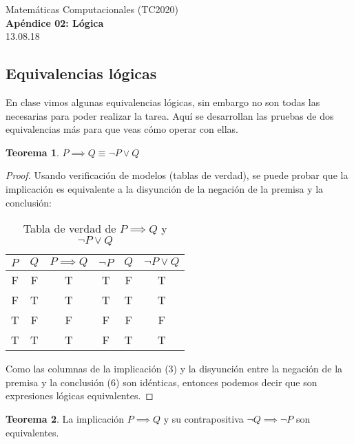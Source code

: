 \documentclass[]{book}
\theoremstyle{definition}
\newtheorem{thm}{Teorema}
\begin{document}
\begin{center}
{\huge Matemáticas Computacionales (TC2020)}\\[1.5ex]
{\large \textbf{Apéndice 02: Lógica}\\[1.5ex] %
13.08.18} %
\end{center}

\vspace{0.2 cm}

\subsection*{Equivalencias lógicas}

En clase vimos algunas equivalencias lógicas, sin embargo no son todas las necesarias para poder realizar la tarea.
Aquí se desarrollan las pruebas de dos equivalencias más para que veas cómo operar con ellas.

\vspace{0.5in}

\begin{thm}
    $P \implies Q \equiv \neg P \vee Q$
\end{thm}

\begin{proof}
    Usando verificación de modelos (tablas de verdad), se puede probar que la implicación es equivalente a la disyunción de la negación de la premisa y la conclusión:

    \begin{table}[htbp]
        \centering
        \caption{Tabla de verdad de $P \implies Q$ y $\neg P \vee Q$}
        \label{tab:implies}
        \begin{tabular}{@{}cccccc@{}}
        \toprule
        \multicolumn{1}{l}{$P$} & \multicolumn{1}{l}{$Q$} & \multicolumn{1}{l}{$P \implies Q$} & \multicolumn{1}{l}{$\neg P$} & \multicolumn{1}{l}{$Q$} & \multicolumn{1}{l}{$\neg P \vee Q$} \\ \midrule
        F & F & T & T & F & T \\
        F & T & T & T & T & T \\
        T & F & F & F & F & F \\
        T & T & T & F & T & T \\ \bottomrule
        \end{tabular}
    \end{table}

Como las columnas de la implicación (3) y la disyunción entre la negación de la premisa y la conclusión (6) son idénticas, entonces podemos decir que son expresiones lógicas equivalentes.
\end{proof}
\vspace{0.5in}
\begin{thm}
    La implicación $P \implies Q$ y su contrapositiva $\neg Q \implies \neg P$ son equivalentes.
\end{thm}
\end{document}
